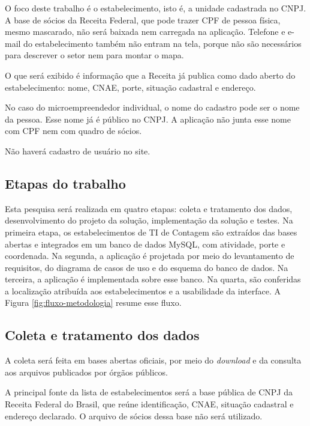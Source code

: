 O foco deste trabalho é o estabelecimento, isto é, a unidade cadastrada no CNPJ.
A base de sócios da Receita Federal, que pode trazer CPF de pessoa física, mesmo mascarado, não será baixada nem carregada na aplicação.
Telefone e e-mail do estabelecimento também não entram na tela, porque não são necessários para descrever o setor nem para montar o mapa.

O que será exibido é informação que a Receita já publica como dado aberto do estabelecimento: nome, CNAE, porte, situação cadastral e endereço.

No caso do microempreendedor individual, o nome do cadastro pode ser o nome da pessoa.
Esse nome já é público no CNPJ.
A aplicação não junta esse nome com CPF nem com quadro de sócios.

Não haverá cadastro de usuário no site.

\subsection{Etapas do trabalho}

Esta pesquisa será realizada em quatro etapas: coleta e tratamento dos dados, desenvolvimento do projeto da solução, implementação da solução e testes.
Na primeira etapa, os estabelecimentos de TI de Contagem são extraídos das bases abertas e integrados em um banco de dados MySQL, com atividade, porte e coordenada.
Na segunda, a aplicação é projetada por meio do levantamento de requisitos, do diagrama de casos de uso e do esquema do banco de dados.
Na terceira, a aplicação é implementada sobre esse banco.
Na quarta, são conferidas a localização atribuída aos estabelecimentos e a usabilidade da interface.
A Figura \ref{fig:fluxo-metodologia} resume esse fluxo.



\subsection{Coleta e tratamento dos dados}
\label{subsec:coleta}

A coleta será feita em bases abertas oficiais, por meio do \textit{download} e da consulta aos arquivos publicados por órgãos públicos.

A principal fonte da lista de estabelecimentos será a base pública de CNPJ da Receita Federal do Brasil, que reúne identificação, CNAE, situação cadastral e endereço declarado.
O arquivo de sócios dessa base não será utilizado.

